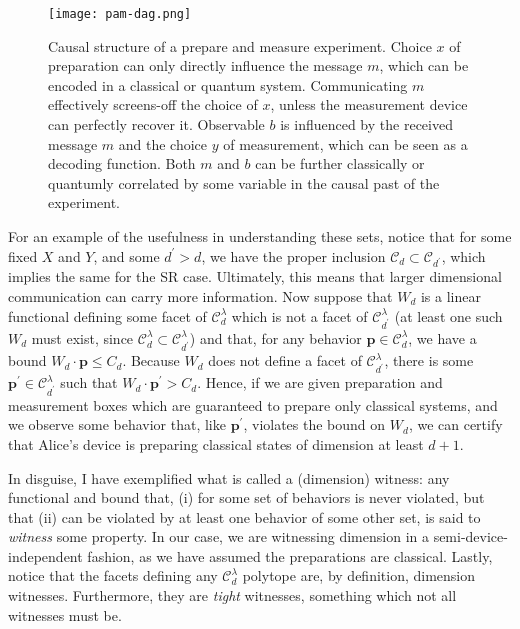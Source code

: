 			\begin{figure}
				\begin{minipage}[c]{0.31\textwidth}
					\centering
					\texttt{[image: pam-dag.png]}
				\end{minipage}
				\begin{minipage}[c]{0.68\textwidth}
					\caption{Causal structure of a prepare and measure experiment. Choice $x$ of preparation can only directly influence the message $m$, which can be encoded in a classical or quantum system. Communicating $m$ effectively screens-off the choice of $x$, unless the measurement device can perfectly recover it. Observable $b$ is influenced by the received message $m$ and the choice $y$ of measurement, which can be seen as a decoding function. Both $m$ and $b$ can be further classically or quantumly correlated by some variable in the causal past of the experiment.}	
					\label{fig:pam-dag}
				\end{minipage}
			\end{figure}
            
            For an example of the usefulness in understanding these sets, notice that for some fixed $X$ and $Y$, and some $d^\prime > d$, we have the proper inclusion $\mathcal{C}_{d} \subset \mathcal{C}_{d^\prime}$, which implies the same for the SR case. Ultimately, this means that larger dimensional communication can carry more information. Now suppose that $W_d$ is a linear functional defining some facet of $\mathcal{C}_{d}^\lambda$ which is not a facet of $\mathcal{C}_{d^\prime}^\lambda$ (at least one such $W_d$ must exist, since $\mathcal{C}_{d}^\lambda \subset \mathcal{C}_{d^\prime}^\lambda$) and that, for any behavior $\mathbf{p} \in \mathcal{C}_d^\lambda$, we have a bound $W_d \cdot \mathbf{p} \leq C_d$. Because $W_d$ does not define a facet of $\mathcal{C}_{d^\prime}^\lambda$, there is some $\mathbf{p}^\prime \in \mathcal{C}_{d^\prime}^\lambda$ such that $W_d \cdot \mathbf{p}^\prime > C_d$. Hence, if we are given preparation and measurement boxes which are guaranteed to prepare only classical systems, and we observe some behavior that, like $\mathbf{p}^\prime$, violates the bound on $W_d$, we can certify that Alice's device is preparing classical states of dimension at least $d+1$.
            
            In disguise, I have exemplified what is called a (dimension) witness: any functional and bound that, (i) for some set of behaviors is never violated, but that (ii) can be violated by at least one behavior of some other set, is said to \emph{witness} some property. In our case, we are witnessing dimension in a semi-device-independent fashion, as we have assumed the preparations are classical. Lastly, notice that the facets defining any $\mathcal{C}_d^\lambda$ polytope are, by definition, dimension witnesses. Furthermore, they are \emph{tight} witnesses, something which not all witnesses must be.
            
